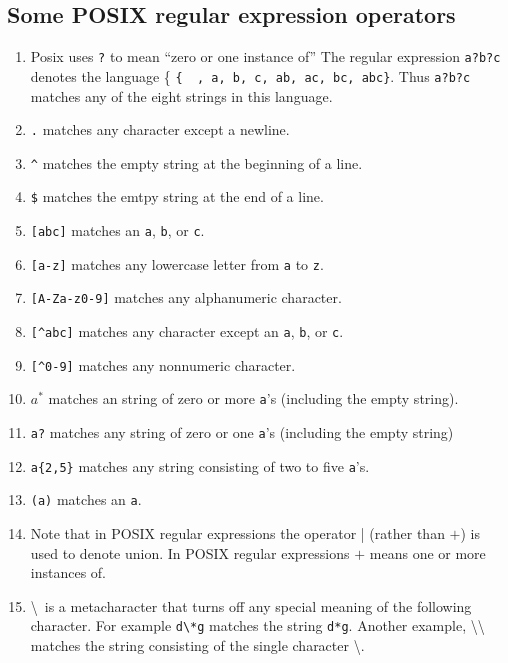 \documentclass[]{article}
\begin{document}
  \subsection*{Some POSIX regular expression operators}
    \begin{enumerate}
      \item Posix uses \texttt{?} to mean ``zero or one instance of'' The
            regular expression \texttt{a?b?c} denotes the language \{
            \texttt{\{\textepsilon \, , a, b, c, ab, ac, bc, abc\}}. Thus
            \texttt{a?b?c} matches any of the eight strings in this language.
      \item \texttt{.} matches any character except a newline.
      \item \texttt{\^} matches the empty string at the beginning of a line.
      \item \texttt{\$} matches the emtpy string at the end of a line.
      \item \texttt{[abc]} matches an \texttt{a}, \texttt{b}, or \texttt{c}.
      \item \texttt{[a-z]} matches any lowercase letter from \texttt{a} to
            \texttt{z}.
      \item \texttt{[A-Za-z0-9]} matches any alphanumeric character.
      \item \texttt{[\^{}abc]} matches any character except an \texttt{a},
            \texttt{b}, or \texttt{c}.
      \item \texttt{[\^{}0-9]} matches any nonnumeric character.
      \item \texttt{$a^*$} matches an string of zero or more \texttt{a}'s
            (including the empty string).
      \item \texttt{a?} matches any string of zero or one \texttt{a}'s
            (including the empty string)
      \item \texttt{a\{2,5\}} matches any string consisting of two to five
            \texttt{a}'s.
      \item \texttt{(a)} matches an \texttt{a}.
      \item Note that in POSIX regular expressions the operator | (rather than
            $+$) is used to denote union. In POSIX regular expressions $+$ means
            one or more instances of.
      \item \textbackslash \, is a metacharacter that turns off any special
            meaning of the following character. For example
            \texttt{d\textbackslash{}*g} matches the string \texttt{d*g}.
            Another example, \textbackslash\textbackslash \, matches the string
            consisting of the single character \textbackslash.
    \end{enumerate}
\end{document}
